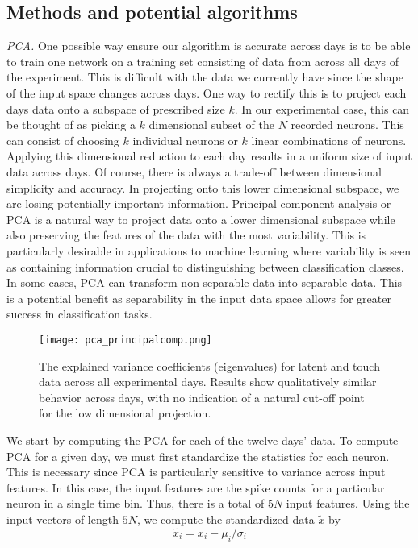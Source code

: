 \documentclass[12pt]{article}
\begin{document}
\subsection{Methods and potential algorithms}
\textit{PCA.} One possible way ensure our algorithm is accurate across days is to be able to train one network on a training set consisting of data from across all days of the experiment. This is difficult with the data we currently have since the shape of the input space changes across days. One way to rectify this is to project each days data onto a subspace of prescribed size $k$. In our experimental case, this can be thought of as picking a $k$ dimensional subset of the $N$ recorded neurons. This can consist of choosing $k$ individual neurons or $k$ linear combinations of neurons. Applying this dimensional reduction to each day results in a uniform size of input data across days. Of course, there is always a trade-off between dimensional simplicity and accuracy. In projecting onto this lower dimensional subspace, we are losing potentially important information. Principal component analysis or PCA is a natural way to project data onto a lower dimensional subspace while also preserving the features of the data with the most variability. This is particularly desirable in applications to machine learning where variability is seen as containing information crucial to distinguishing between classification classes. In some cases, PCA can transform non-separable data into separable data. This is a potential benefit as separability in the input data space allows for greater success in classification tasks.\\
\begin{figure}
  \centering
 \texttt{[image: pca\_principalcomp.png]}
 \caption{The explained variance coefficients (eigenvalues) for latent and touch data across all experimental days. Results show qualitatively similar behavior across days, with no indication of a natural cut-off point for the low dimensional projection.}
 \label{ref:pca}
 \end{figure}
We start by computing the PCA for each of the twelve days' data. To compute PCA for a given day, we must first standardize the statistics for each neuron. This is necessary since PCA is particularly sensitive to variance across input features. In this case, the input features are the spike counts for a particular neuron in a single time bin. Thus, there is a total of $5N$ input features. Using the input vectors of length $5N$, we compute the standardized data $\tilde{x}$ by
$$ \tilde{x_i} = x_i - \mu_i / \sigma_i $$
\end{document}

